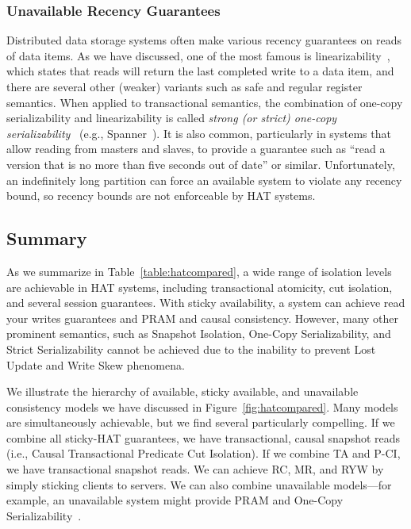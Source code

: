 \subsubsection{Unavailable Recency Guarantees}

Distributed data storage systems often make various recency guarantees
on reads of data items. As we have discussed, one of the most famous
is linearizability~\cite{herlihy-art}, which states that reads will
return the last completed write to a data item, and there are several
other (weaker) variants such as safe and regular register
semantics. When applied to transactional semantics, the combination of
one-copy serializability and linearizability is called \textit{strong
  (or strict) one-copy serializability}~\cite{adya} (e.g.,
Spanner~\cite{spanner}). It is also common, particularly in systems
that allow reading from masters and slaves, to provide a guarantee
such as ``read a version that is no more than five seconds out of
date'' or similar. Unfortunately, an indefinitely long partition can
force an available system to violate any recency bound, so recency
bounds are not enforceable by HAT systems.

\subsection{Summary}
\label{sec:hat-summary}

As we summarize in Table~\ref{table:hatcompared}, a wide range of
isolation levels are achievable in HAT systems, including
transactional atomicity, cut isolation, and several session
guarantees. With sticky availability, a system can achieve read your
writes guarantees and PRAM and causal consistency. However, many other
prominent semantics, such as Snapshot Isolation, One-Copy
Serializability, and Strict Serializability cannot be achieved due to
the inability to prevent Lost Update and Write Skew phenomena.

We illustrate the hierarchy of available, sticky available, and
unavailable consistency models we have discussed in
Figure~\ref{fig:hatcompared}. Many models are simultaneously
achievable, but we find several particularly compelling. If we combine
all sticky-HAT guarantees, we have transactional, causal snapshot
reads (i.e., Causal Transactional Predicate Cut Isolation). If we
combine TA and P-CI, we have transactional snapshot reads. We can
achieve RC, MR, and RYW by simply sticking clients to servers. We can
also combine unavailable models---for example, an unavailable system
might provide PRAM and One-Copy
Serializability~\cite{daudjee-session}.

